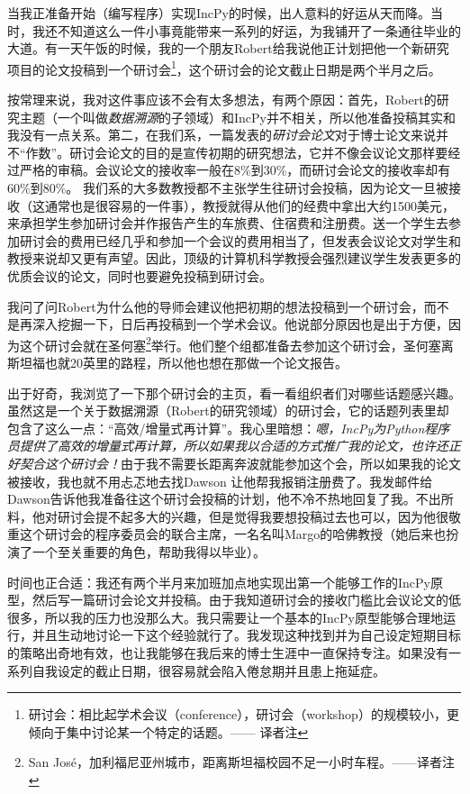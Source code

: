 \documentclass[letter,12pt]{book}
\begin{document}
\begin{CJK}{UTF8}{gbsn}
当我正准备开始（编写程序）实现IncPy的时候，出人意料的好运从天而降。当时，我还不知道这么一件小事竟能带来一系列的好运，为我铺开了一条通往毕业的大道。有一天午饭的时候，我的一个朋友Robert给我说他正计划把他一个新研究项目的论文投稿到一个研讨会\footnote{研讨会：相比起学术会议（conference），研讨会（workshop）的规模较小，更倾向于集中讨论某一个特定的话题。—— 译者注}，这个研讨会的论文截止日期是两个半月之后。

按常理来说，我对这件事应该不会有太多想法，有两个原因：首先，Robert的研究主题（一个叫做\emph{数据溯源}的子领域）和IncPy并不相关，所以他准备投稿其实和我没有一点关系。第二，在我们系，一篇发表的\emph{研讨会论文}对于博士论文来说并不“作数”。研讨会论文的目的是宣传初期的研究想法，它并不像会议论文那样要经过严格的审稿。会议论文的接收率一般在8\%到30\%，而研讨会论文的接收率却有60\%到80\%。 我们系的大多数教授都不主张学生往研讨会投稿，因为论文一旦被接收（这通常也是很容易的一件事），教授就得从他们的经费中拿出大约1500美元，来承担学生参加研讨会并作报告产生的车旅费、住宿费和注册费。送一个学生去参加研讨会的费用已经几乎和参加一个会议的费用相当了，但发表会议论文对学生和教授来说却又更有声望。因此，顶级的计算机科学教授会强烈建议学生发表更多的优质会议的论文，同时也要避免投稿到研讨会。

我问了问Robert为什么他的导师会建议他把初期的想法投稿到一个研讨会，而不是再深入挖掘一下，日后再投稿到一个学术会议。他说部分原因也是出于方便，因为这个研讨会就在圣何塞\footnote{San Jos\'e，加利福尼亚州城市，距离斯坦福校园不足一小时车程。——译者注}举行。他们整个组都准备去参加这个研讨会，圣何塞离斯坦福也就20英里的路程，所以他也想在那做一个论文报告。

出于好奇，我浏览了一下那个研讨会的主页，看一看组织者们对哪些话题感兴趣。虽然这是一个关于数据溯源（Robert的研究领域）的研讨会，它的话题列表里却包含了这么一点：“高效/增量式再计算”。我心里暗想：\emph{嗯，IncPy为Python程序员提供了高效的增量式再计算，所以如果我以合适的方式推广我的论文，也许还正好契合这个研讨会！}由于我不需要长距离奔波就能参加这个会，所以如果我的论文被接收，我也就不用忐忑地去找Dawson 让他帮我报销注册费了。我发邮件给Dawson告诉他我准备往这个研讨会投稿的计划，他不冷不热地回复了我。不出所料，他对研讨会提不起多大的兴趣，但是觉得我要想投稿过去也可以，因为他很敬重这个研讨会的程序委员会的联合主席，一名名叫Margo的哈佛教授（她后来也扮演了一个至关重要的角色，帮助我得以毕业）。

时间也正合适：我还有两个半月来加班加点地实现出第一个能够工作的IncPy原型，然后写一篇研讨会论文并投稿。由于我知道研讨会的接收门槛比会议论文的低很多，所以我的压力也没那么大。我只需要让一个基本的IncPy原型能够合理地运行，并且生动地讨论一下这个经验就行了。我发现这种找到并为自己设定短期目标的策略出奇地有效，也让我能够在我后来的博士生涯中一直保持专注。如果没有一系列自我设定的截止日期，很容易就会陷入倦怠期并且患上拖延症。


\end{CJK}
\end{document}
